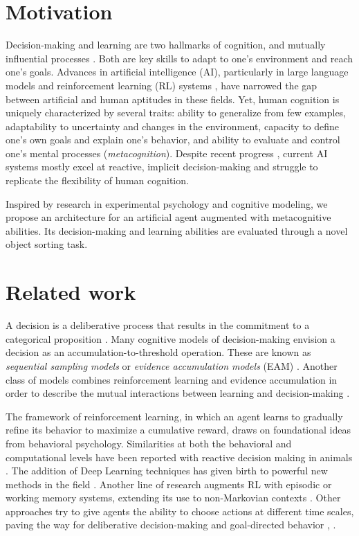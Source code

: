 \documentclass[10pt, a4paper]{collection-edmi}
\begin{document}
\begin{content}
\section{Motivation}
Decision-making and learning are two hallmarks of cognition, and mutually influential processes \cite{mileticNewModelDecision2021}. Both are key skills to adapt to one's environment and reach one's goals. Advances in artificial intelligence (AI), particularly in large language models \cite{radfordLLM} and reinforcement learning (RL) systems \cite{suttonBartoRL}, have narrowed the gap between artificial and human aptitudes in these fields. Yet, human cognition is uniquely characterized by several traits: ability to generalize from few examples, adaptability to uncertainty and changes in the environment, capacity to define one's own goals and explain one's behavior, and ability to evaluate and control one's mental processes (\textit{metacognition}). Despite recent progress \cite{weiCoTreasoning2024} \cite{botvinickRLfastslow}, current AI systems mostly excel at reactive, implicit decision-making and struggle to replicate the flexibility of human cognition.

Inspired by research in experimental psychology and cognitive modeling, we propose an architecture for an artificial agent augmented with metacognitive abilities. Its decision-making and learning abilities are evaluated through a novel object sorting task.

\section{Related work}

A decision is a deliberative process that results in the commitment to a categorical proposition \cite{goldNeuralBasis2007}. Many cognitive models of decision-making envision a decision as an accumulation-to-threshold operation. These are known as \textit{sequential sampling models} or \textit{evidence accumulation models} (EAM) \cite{forstmannSSM2016}. Another class of models combines reinforcement learning and evidence accumulation in order to describe the mutual interactions between learning and decision-making \cite{mileticNewModelDecision2021}.

The framework of reinforcement learning, in which an agent learns to gradually refine its behavior to maximize a cumulative reward, draws on foundational ideas from behavioral psychology. Similarities at both the behavioral and computational levels have been reported with reactive decision making in animals \cite{suriNNDopamine1999}. The addition of Deep Learning techniques has given birth to powerful new methods in the field \cite{mnihDQN2015}. Another line of research augments RL with episodic or working memory systems, extending its use to non-Markovian contexts \cite{zilliModelingWMEM2008}. Other approaches try to give agents the ability to choose actions at different time scales, paving the way for deliberative decision-making and goal-directed behavior \cite{stolleOptionsRL2002}, \cite{baconOptionCritic2016}.


\end{content}
\end{document}
